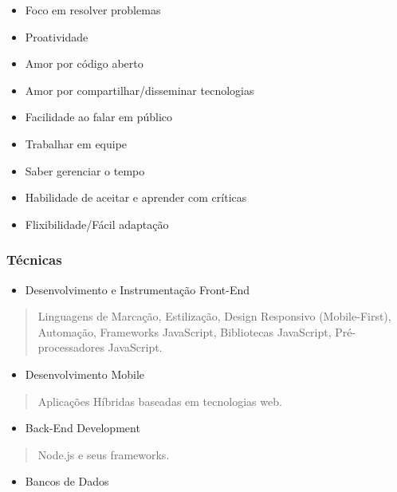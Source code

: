 \documentclass[]{article}
\providecommand{\tightlist}{%
  \setlength{\itemsep}{0pt}\setlength{\parskip}{0pt}}
\begin{document}
\begin{itemize}
\tightlist
\item
  Foco em resolver problemas
\item
  Proatividade
\item
  Amor por código aberto
\item
  Amor por compartilhar/disseminar tecnologias
\item
  Facilidade ao falar em público
\item
  Trabalhar em equipe
\item
  Saber gerenciar o tempo
\item
  Habilidade de aceitar e aprender com críticas
\item
  Flixibilidade/Fácil adaptação
\end{itemize}

\subsubsection{Técnicas}\label{tuxe9cnicas}

\begin{itemize}
\tightlist
\item
  Desenvolvimento e Instrumentação Front-End
\end{itemize}

\begin{quote}
Linguagens de Marcação, Estilização, Design Responsivo (Mobile-First),
Automação, Frameworks JavaScript, Bibliotecas JavaScript,
Pré-processadores JavaScript.
\end{quote}

\begin{itemize}
\tightlist
\item
  Desenvolvimento Mobile
\end{itemize}

\begin{quote}
Aplicações Híbridas baseadas em tecnologias web.
\end{quote}

\begin{itemize}
\tightlist
\item
  Back-End Development
\end{itemize}

\begin{quote}
Node.js e seus frameworks.
\end{quote}

\begin{itemize}
\tightlist
\item
  Bancos de Dados
\end{itemize}
\end{document}
